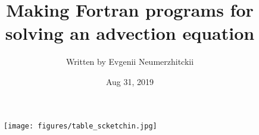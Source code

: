 \documentclass[a4paper,twoside,12pt,hidelinks]{article}
\title{Making Fortran programs for solving an advection equation}
\author{Written by Evgenii Neumerzhitckii}
\date{Aug 31, 2019}
\begin{document}


\maketitle
\thispagestyle{empty} %

\pagebreak

\tableofcontents

\begin{figure}[H]
  \centering
  \texttt{[image: figures/table\_scketchin.jpg]}
\end{figure}

\pagebreak




\pagebreak
\end{document}
